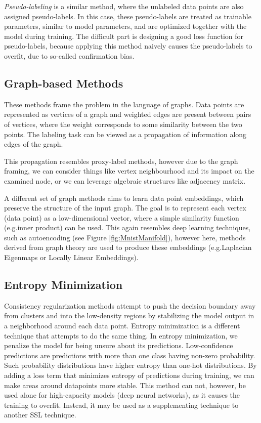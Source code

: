 \emph{Pseudo-labeling} is a similar method, where the unlabeled data points are also assigned pseudo-labels. In this case, these pseudo-labels are treated as trainable parameters, similar to model parameters, and are optimized together with the model during training. The difficult part is designing a good loss function for pseudo-labels, because applying this method naively causes the pseudo-labels to overfit, due to so-called confirmation bias.


\subsection{Graph-based Methods}

These methods frame the problem in the language of graphs. Data points are represented as vertices of a graph and weighted edges are present between pairs of vertices, where the weight corresponds to some similarity between the two points. The labeling task can be viewed as a propagation of information along edges of the graph.

This propagation resembles proxy-label methods, however due to the graph framing, we can consider things like vertex neighbourhood and its impact on the examined node, or we can leverage algebraic structures like adjacency matrix.

A different set of graph methods aims to learn data point embeddings, which preserve the structure of the input graph. The goal is to represent each vertex (data point) as a low-dimensional vector, where a simple similarity function (e.g.\@ inner product) can be used. This again resembles deep learning techniques, such as autoencoding (see Figure \ref{fig:MnistManifold}), however here, methods derived from graph theory are used to produce these embeddings (e.g.\@ Laplacian Eigenmaps or Locally Linear Embeddings).


\subsection{Entropy Minimization}
\label{sec:EntropyMinimization}

Consistency regularization methods attempt to push the decision boundary away from clusters and into the low-density regions by stabilizing the model output in a neighborhood around each data point. Entropy minimization is a different technique that attempts to do the same thing. In entropy minimization, we penalize the model for being unsure about its predictions. Low-confidence predictions are predictions with more than one class having non-zero probability. Such probability distributions have higher entropy than one-hot distributions. By adding a loss term that minimizes entropy of predictions during training, we can make areas around datapoints more stable. This method can not, however, be used alone for high-capacity models (deep neural networks), as it causes the training to overfit. Instead, it may be used as a supplementing technique to another SSL technique.


